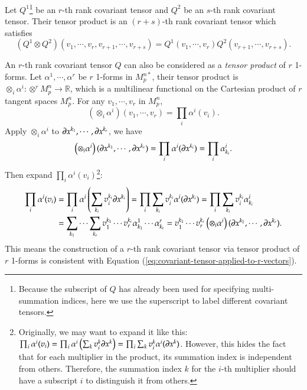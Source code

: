 \documentclass[11pt, a4paper]{book}
\begin{document}
\begin{Definition}
  Let $Q^1$\footnote{Because the subscript of $Q$ has already been used for specifying
    multi-summation indices, here we use the superscript to label different covariant
    tensors.} be an $r$-th rank covariant tensor and $Q^2$ be an $s$-th rank covariant
  tensor. Their tensor product is an $(r+s)$-th rank covariant tensor which satisfies
  \begin{equation}
    \label{eq:tensor-product-of-covariant-tensors}
    \left( Q^1 \otimes Q^2 \right) (v_{1},\cdots,v_{r}, v_{r+1},\cdots,v_{r+s}) =
    Q^1(v_{1},\cdots,v_{r}) Q^2(v_{r+1},\cdots,v_{r+s}).
  \end{equation}
\end{Definition}

An $r$-th rank covariant tensor $Q$ can also be considered as a \emph{tensor product} of
$r$ 1-forms. Let $\alpha^1,\cdots,\alpha^r$ be $r$ 1-forms in $M_p^{n*}$, their tensor product
is $\otimes_i\alpha^i: \otimes^r M_p^n \rightarrow \mathbb{R}$, which is a multilinear
functional on the Cartesian product of $r$ tangent spaces $M_p^n$. For any
$v_1, \cdots, v_r$ in $M_p^n$,
\begin{equation}
  \left(\otimes_i\alpha^i\right)(v_1,\cdots,v_r) = \prod_i \alpha^i(v_i).
\end{equation}
Apply $\otimes_i\alpha^i$ to $\boldsymbol{\partial}x^{k_1},\cdots,\boldsymbol{\partial}x^{k_r}$, we have
\begin{equation}
  \left( \otimes_i\alpha^i \right)(\boldsymbol{\partial}x^{k_1},\cdots,\boldsymbol{\partial}x^{k_r}) =
  \prod_i\alpha^i(\boldsymbol{\partial}x^{k_i}) = \prod_i \alpha_{k_i}^{i}.
\end{equation}
Then expand $\prod_i \alpha^i(v_i)$\footnote{Originally, we may want to expand it like this:
  $\prod_i \alpha^i(v_i) = \prod_i \alpha^i\left( \sum_k v_i^k \boldsymbol{\partial}x^k \right) =
  \prod_i \sum_k v_i^k \alpha^i(\boldsymbol{\partial}x^k)$. However, this hides the fact that for
  each multiplier in the product, its summation index is independent from others.
  Therefore, the summation index $k$ for the $i$-th multiplier should have a subscript $i$
  to distinguish it from others.}:
\begin{equation}
  \begin{aligned}
    \prod_i \alpha^i(v_i) &= \prod_i \alpha^i\left( \sum_{k_i}v_i^{k_i}
      \boldsymbol{\partial}x^{k_i} \right) = \prod_i \sum_{k_i}v_i^{k_i}
    \alpha^i(\boldsymbol{\partial}x^{k_i}) = \prod_i \sum_{k_i} v_i^{k_i} \alpha_{k_i}^i \\
    &= \sum_{k_1}\cdots\sum_{k_r} v_1^{k_1}\cdots v_r^{k_r}
    \alpha_{k_1}^1\cdots\alpha_{k_r}^r = v_1^{k_1}\cdots v_r^{k_r} \left(
      \otimes_i\alpha^i \right)(\boldsymbol{\partial}x^{k_1},\cdots,\boldsymbol{\partial}x^{k_r}).
  \end{aligned}
\end{equation}
This means the construction of a $r$-th rank covariant tensor via tensor product of $r$
1-forms is consistent with Equation (\ref{eq:covariant-tensor-applied-to-r-vectors}).
\end{document}
